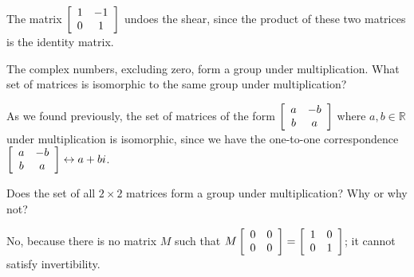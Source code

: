 \documentclass[../key.tex]{subfiles}
\begin{document}
The matrix $\left[\begin{array}{cc} 1 & -1 \\ 0 & 1 \end{array}\right]$ undoes the shear, since the product of these two matrices is the identity matrix.

\begin{outer_problem}
\item The complex numbers, excluding zero, form a group under multiplication. What set of matrices is isomorphic to the same group under multiplication?
\end{outer_problem}

As we found previously, the set of matrices of the form $\left[\begin{array}{cc} a & -b \\ b & a \end{array}\right]$ where $a,b\in\mathbb{R}$ under multiplication is isomorphic, since we have the one-to-one correspondence $\left[\begin{array}{cc} a & -b \\ b & a \end{array}\right]\leftrightarrow a+bi$.

\begin{outer_problem}
\item Does the set of all $2\times 2$ matrices form a group under multiplication? Why or why not?
\end{outer_problem}

No, because there is no matrix $M$ such that $M\left[\begin{array}{cc} 0 & 0 \\ 0 & 0 \end{array}\right] = \left[\begin{array}{cc} 1 & 0 \\ 0 & 1 \end{array}\right]$; it cannot satisfy invertibility.
\end{document}
